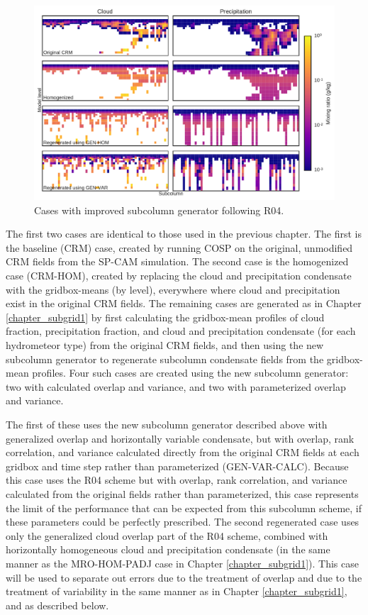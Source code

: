\begin{figure}
\centering
\includegraphics[width=\columnwidth]{graphics/mxratio_gen-var.pdf}
\caption{Cases with improved subcolumn generator following R04.}
\label{mxratio_gen-var}
\end{figure}

The first two cases are identical to those used in the previous chapter. The first is the baseline (CRM) case, created by running COSP on the original, unmodified CRM fields from the SP-CAM simulation. The second case is the homogenized case (CRM-HOM), created by replacing the cloud and precipitation condensate with the gridbox-means (by level), everywhere where cloud and precipitation exist in the original CRM fields. The remaining cases are generated as in Chapter \ref{chapter_subgrid1} by first calculating the gridbox-mean profiles of cloud fraction, precipitation fraction, and cloud and precipitation condensate (for each hydrometeor type) from the original CRM fields, and then using the new subcolumn generator to regenerate subcolumn condensate fields from the gridbox-mean profiles. Four such cases are created using the new subcolumn generator: two with calculated overlap and variance, and two with parameterized overlap and variance. 

The first of these uses the new subcolumn generator described above with generalized overlap and horizontally variable condensate, but with overlap, rank correlation, and variance calculated directly from the original CRM fields at each gridbox and time step rather than parameterized (GEN-VAR-CALC). Because this case uses the R04 scheme but with overlap, rank correlation, and variance calculated from the original fields rather than parameterized, this case represents the limit of the performance that can be expected from this subcolumn scheme, if these parameters could be perfectly prescribed. The second regenerated case uses only the generalized cloud overlap part of the R04 scheme, combined with horizontally homogeneous cloud and precipitation condensate (in the same manner as the MRO-HOM-PADJ case in Chapter \ref{chapter_subgrid1}). This case will be used to separate out errors due to the treatment of overlap and due to the treatment of variability in the same manner as in Chapter \ref{chapter_subgrid1}, and as described below.

